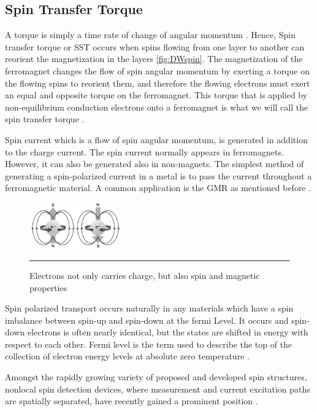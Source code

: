 \subsection{Spin Transfer Torque}

A torque is simply a time rate of change of angular momentum \cite{spintransfer}. Hence, Spin transfer torque or SST occurs when spins flowing from one layer to another can reorient the magnetization in the layers \ref{fig:DWspin}. The magnetization of the ferromagnet changes the flow of spin angular momentum by exerting a torque on the flowing spins to reorient them, and therefore the flowing electrons must exert an equal and opposite torque on the ferromagnet. This torque that is applied by non-equilibrium conduction electrons onto a ferromagnet is what we will call the spin transfer torque \cite{spintransfer}.

Spin current which is a flow of spin angular momentum, is generated in addition to the charge current. The spin current normally appears in ferromagnets. However, it can also be generated also in non-magnets. The simplest method of generating a spin-polarized current in a metal is to pass the current throughout a ferromagnetic material. A common application is the GMR as mentioned before \cite{handbookspin}.

\begin{figure}[htbp]
	\centering
		\includegraphics[width=0.35\textwidth]{Figures/electron.png}
		\rule{35em}{0.5pt}
	\caption[Electron carries spin, charge and magnetic]{Electrons not only carries charge, but also spin and magnetic properties }
	\label{fig:electron}
\end{figure}


Spin polarized transport occurs naturally in any materials which have a spin imbalance between spin-up and spin-down at the fermi Level. It occurs and spin-down electrons is often nearly identical, but the states are shifted in energy with respect to each other. Fermi level is the term used to describe the top of the collection of electron energy levels at absolute zero temperature \cite{handbookspin}.

Amongst the rapidly growing variety of proposed and developed spin structures, nonlocal spin detection devices, where measurement and current excitation paths are spatially separated, have recently gained a prominent position \cite{spinz}.

